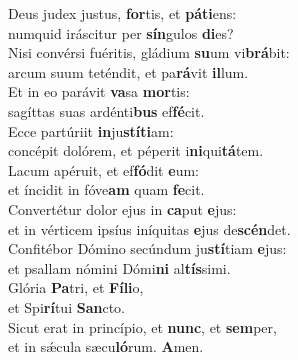 \evenverse Deus judex justus, \textbf{for}tis, et \textbf{pá}\textbf{ti}ens:~\*\\
\evenverse numquid iráscitur per \textbf{sín}gulos \textbf{di}es?\\
\oddverse Nisi convérsi fuéritis, gládium \textbf{su}um vi\textbf{brá}bit:~\*\\
\oddverse arcum suum teténdit, et pa\textbf{rá}vit \textbf{il}lum.\\
\evenverse Et in eo parávit \textbf{va}sa \textbf{mor}tis:~\*\\
\evenverse sagíttas suas ardénti\textbf{bus} ef\textbf{fé}cit.\\
\oddverse Ecce partúriit \textbf{in}ju\textbf{stí}\textbf{ti}am:~\*\\
\oddverse concépit dolórem, et péperit i\textbf{ni}qui\textbf{tá}tem.\\
\evenverse Lacum apéruit, et ef\textbf{fó}dit \textbf{e}um:~\*\\
\evenverse et íncidit in fóve\textbf{am} quam \textbf{fe}cit.\\
\oddverse Convertétur dolor ejus in \textbf{ca}put \textbf{e}jus:~\*\\
\oddverse et in vérticem ipsíus iníquitas \textbf{e}jus de\textbf{scén}det.\\
\evenverse Confitébor Dómino secúndum ju\textbf{stí}tiam \textbf{e}jus:~\*\\
\evenverse et psallam nómini Dómi\textbf{ni} al\textbf{tís}simi.\\
\oddverse Glória \textbf{Pa}tri, et \textbf{Fí}\textbf{li}o,~\*\\
\oddverse et Spi\textbf{rí}tui \textbf{San}cto.\\
\evenverse Sicut erat in princípio, et \textbf{nunc}, et \textbf{sem}per,~\*\\
\evenverse et in sǽcula sæcu\textbf{ló}rum. \textbf{A}men.\\
